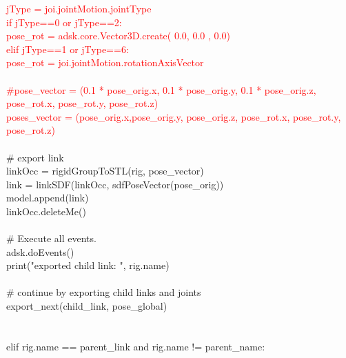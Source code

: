 {\hphantom{\quad\quad\quad\quad\quad\quad\quad}\textcolor{red}{jType = joi.jointMotion.jointType\\
\hphantom{\quad\quad\quad\quad\quad\quad\quad}if jType==0 or jType==2:\\
\hphantom{\quad\quad\quad\quad\quad\quad\quad\quad}pose\_rot = adsk.core.Vector3D.create( 0.0, 0.0 , 0.0)\\
\hphantom{\quad\quad\quad\quad\quad\quad\quad}elif jType==1 or jType==6: \\
\hphantom{\quad\quad\quad\quad\quad\quad\quad\quad}pose\_rot = joi.jointMotion.rotationAxisVector}\\
\\
\hphantom{\quad\quad\quad\quad\quad\quad\quad}\textcolor{red}{\#pose\_vector = (0.1 * pose\_orig.x, 0.1 * pose\_orig.y, 0.1 * pose\_orig.z, pose\_rot.x, pose\_rot.y, pose\_rot.z)\\
\hphantom{\quad\quad\quad\quad\quad\quad\quad}poses\_vector = (pose\_orig.x,pose\_orig.y, pose\_orig.z, pose\_rot.x, pose\_rot.y, pose\_rot.z)}\\
\\
\hphantom{\quad\quad\quad\quad\quad\quad\quad}\# export link\\
\hphantom{\quad\quad\quad\quad\quad\quad\quad}linkOcc = rigidGroupToSTL(rig, pose\_vector)\\
\hphantom{\quad\quad\quad\quad\quad\quad\quad}link = linkSDF(linkOcc, sdfPoseVector(pose\_orig))\\
\hphantom{\quad\quad\quad\quad\quad\quad\quad}model.append(link)\\
\hphantom{\quad\quad\quad\quad\quad\quad\quad}linkOcc.deleteMe()\\
\\
\hphantom{\quad\quad\quad\quad\quad\quad\quad}\# Execute all events.\\
\hphantom{\quad\quad\quad\quad\quad\quad\quad}adsk.doEvents()\\
\hphantom{\quad\quad\quad\quad\quad\quad\quad}print("exported child link: ", rig.name)\\
\\
\hphantom{\quad\quad\quad\quad\quad\quad\quad}\# continue by exporting child links and joints\\
\hphantom{\quad\quad\quad\quad\quad\quad\quad}export\_next(child\_link, pose\_global)\\
\\
\\
\hphantom{\quad\quad\quad\quad\quad\quad}elif rig.name == parent\_link and rig.name != parent\_name:\\
}
